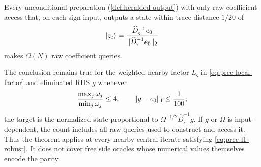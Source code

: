 \begin{theorem}
\label{thm:prec-factor-rhs-hardness}
Every unconditional preparation (\cref{def:heralded-output}) with only raw
coefficient access that, on each sign input,
outputs a state within
trace distance $1/20$ of
\begin{equation}
 \lvert z_\varsigma\rangle=
 \frac{\widehat D_\varsigma^{-1}e_0}
      {\lVert\widehat D_\varsigma^{-1}e_0\rVert_2}             \label{eq:prec-prefix-state}
\end{equation}
makes $\Omega(N)$ raw coefficient queries.

The conclusion remains true for the weighted nearby factor $L_\varsigma$ in
\eqref{eq:prec-local-factor} and eliminated RHS $g$ whenever
\begin{equation}
 \frac{\max_j\omega_j}{\min_j\omega_j}\leq4,\qquad
 \lVert g-e_0\rVert_1\leq\frac1{100};                           \label{eq:prec-l1-robust}
\end{equation}
the target is the normalized state proportional to
$\Omega^{-1/2}\widehat D_\varsigma^{-1}g$.  If $g$ or $\Omega$ is
input-dependent, the count includes all raw queries used to construct and
access it.  Thus the theorem applies at every nearby central iterate
satisfying \eqref{eq:prec-l1-robust}.  It does not cover free side oracles
whose numerical values themselves encode the parity.
\end{theorem}

